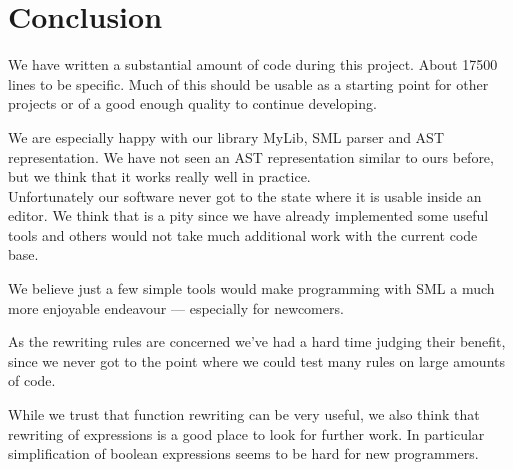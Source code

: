 \chapter{Conclusion}
We have written a substantial amount of code during this project. About 17500
lines to be specific. Much of this should be usable as a starting point for
other projects or of a good enough quality to continue developing.

We are especially happy with our library MyLib, SML parser and AST
representation. We have not seen an AST representation similar to ours before,
but we think that it works really well in practice.\\[1em]

\noindent
Unfortunately our software never got to the state where it is usable inside an
editor. We think that is a pity since we have already implemented some useful
tools and others would not take much additional work with the current code
base.

We believe just a few simple tools would make programming with SML a much more
enjoyable endeavour --- especially for newcomers.

As the rewriting rules are concerned we've had a hard time judging their
benefit, since we never got to the point where we could test many rules on large
amounts of code.

While we trust that function rewriting can be very useful, we also think that
rewriting of expressions is a good place to look for further
work. In particular simplification of boolean expressions seems to be hard for
new programmers.

